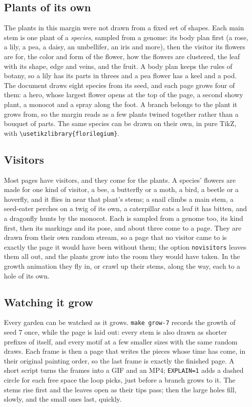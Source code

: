 \documentclass[11pt,a4paper]{article}
\newcommand\code[1]{\texttt{\small #1}}
\begin{document}
\subsection{Plants of its own}

The plants in this margin were not drawn from a fixed set of shapes. Each main stem is one
plant of a \emph{species}, sampled from a genome: its body plan first (a rose, a lily, a
pea, a daisy, an umbellifer, an iris and more), then the visitor its flowers are for, the
color and form of the flower, how the flowers are clustered, the leaf with its shape, edge
and veins, and the fruit. A body plan keeps the rules of botany, so a lily has its parts in
threes and a pea flower has a keel and a pod. The document draws eight species from its
seed, and each page grows four of them: a hero, whose largest flower opens at the top of the
page, a second showy plant, a monocot and a spray along the foot. A branch belongs to the
plant it grows from, so the margin reads as a few plants twined together rather than a
bouquet of parts. The same species can be drawn on their own, in pure TikZ, with
\code{\textbackslash usetikzlibrary\{florilegium\}}.

\subsection{Visitors}

Most pages have visitors, and they come for the plants. A species' flowers are made for one
kind of visitor, a bee, a butterfly or a moth, a bird, a beetle or a hoverfly, and it flies in
near that plant's stems; a snail climbs a main stem, a seed-eater perches on a twig of its own,
a caterpillar eats a leaf it has bitten, and a dragonfly hunts by the monocot. Each is sampled
from a genome too, its kind first, then its markings and its pose, and about three come to a
page. They are drawn from their own random stream, so a page that no visitor came to is exactly
the page it would have been without them; the option \code{novisitors} leaves them all out, and
the plants grow into the room they would have taken. In the growth
animation they fly in, or crawl up their stems, along the way, each to a hole of its own.

\subsection{Watching it grow}

Every garden can be watched as it grows. \code{make grow-7} records the growth of seed 7
once, while the page is laid out: every stem is also drawn as shorter prefixes of itself,
and every motif at a few smaller sizes with the same random draws. Each frame is then a
page that writes the pieces whose time has come, in their original painting order, so the
last frame is exactly the finished page. A short script turns the frames into a GIF and an
MP4; \code{EXPLAIN=1} adds a dashed circle for each free space the loop picks, just before
a branch grows to it. The stems rise first and the leaves open as their tips pass; then
the large holes fill, slowly, and the small ones last, quickly.
\end{document}
